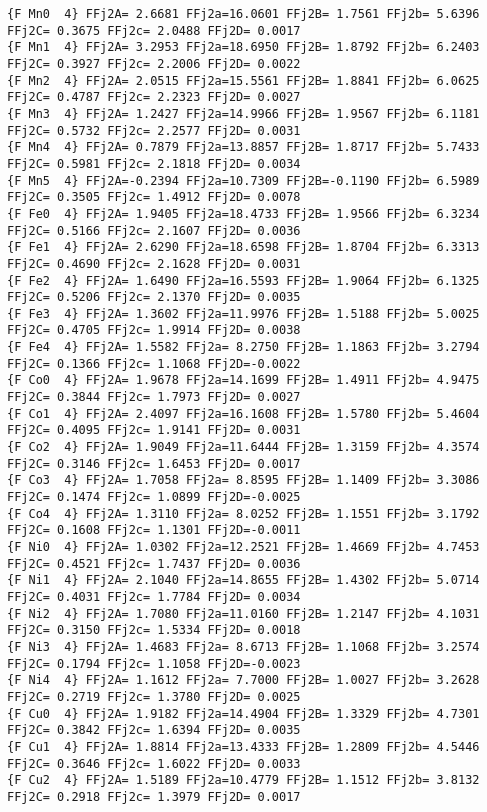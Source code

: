 {\begin{verbatim}
{F Mn0  4} FFj2A= 2.6681 FFj2a=16.0601 FFj2B= 1.7561 FFj2b= 5.6396 FFj2C= 0.3675 FFj2c= 2.0488 FFj2D= 0.0017 
{F Mn1  4} FFj2A= 3.2953 FFj2a=18.6950 FFj2B= 1.8792 FFj2b= 6.2403 FFj2C= 0.3927 FFj2c= 2.2006 FFj2D= 0.0022 
{F Mn2  4} FFj2A= 2.0515 FFj2a=15.5561 FFj2B= 1.8841 FFj2b= 6.0625 FFj2C= 0.4787 FFj2c= 2.2323 FFj2D= 0.0027 
{F Mn3  4} FFj2A= 1.2427 FFj2a=14.9966 FFj2B= 1.9567 FFj2b= 6.1181 FFj2C= 0.5732 FFj2c= 2.2577 FFj2D= 0.0031 
{F Mn4  4} FFj2A= 0.7879 FFj2a=13.8857 FFj2B= 1.8717 FFj2b= 5.7433 FFj2C= 0.5981 FFj2c= 2.1818 FFj2D= 0.0034 
{F Mn5  4} FFj2A=-0.2394 FFj2a=10.7309 FFj2B=-0.1190 FFj2b= 6.5989 FFj2C= 0.3505 FFj2c= 1.4912 FFj2D= 0.0078 
{F Fe0  4} FFj2A= 1.9405 FFj2a=18.4733 FFj2B= 1.9566 FFj2b= 6.3234 FFj2C= 0.5166 FFj2c= 2.1607 FFj2D= 0.0036 
{F Fe1  4} FFj2A= 2.6290 FFj2a=18.6598 FFj2B= 1.8704 FFj2b= 6.3313 FFj2C= 0.4690 FFj2c= 2.1628 FFj2D= 0.0031 
{F Fe2  4} FFj2A= 1.6490 FFj2a=16.5593 FFj2B= 1.9064 FFj2b= 6.1325 FFj2C= 0.5206 FFj2c= 2.1370 FFj2D= 0.0035 
{F Fe3  4} FFj2A= 1.3602 FFj2a=11.9976 FFj2B= 1.5188 FFj2b= 5.0025 FFj2C= 0.4705 FFj2c= 1.9914 FFj2D= 0.0038 
{F Fe4  4} FFj2A= 1.5582 FFj2a= 8.2750 FFj2B= 1.1863 FFj2b= 3.2794 FFj2C= 0.1366 FFj2c= 1.1068 FFj2D=-0.0022 
{F Co0  4} FFj2A= 1.9678 FFj2a=14.1699 FFj2B= 1.4911 FFj2b= 4.9475 FFj2C= 0.3844 FFj2c= 1.7973 FFj2D= 0.0027 
{F Co1  4} FFj2A= 2.4097 FFj2a=16.1608 FFj2B= 1.5780 FFj2b= 5.4604 FFj2C= 0.4095 FFj2c= 1.9141 FFj2D= 0.0031 
{F Co2  4} FFj2A= 1.9049 FFj2a=11.6444 FFj2B= 1.3159 FFj2b= 4.3574 FFj2C= 0.3146 FFj2c= 1.6453 FFj2D= 0.0017 
{F Co3  4} FFj2A= 1.7058 FFj2a= 8.8595 FFj2B= 1.1409 FFj2b= 3.3086 FFj2C= 0.1474 FFj2c= 1.0899 FFj2D=-0.0025 
{F Co4  4} FFj2A= 1.3110 FFj2a= 8.0252 FFj2B= 1.1551 FFj2b= 3.1792 FFj2C= 0.1608 FFj2c= 1.1301 FFj2D=-0.0011 
{F Ni0  4} FFj2A= 1.0302 FFj2a=12.2521 FFj2B= 1.4669 FFj2b= 4.7453 FFj2C= 0.4521 FFj2c= 1.7437 FFj2D= 0.0036 
{F Ni1  4} FFj2A= 2.1040 FFj2a=14.8655 FFj2B= 1.4302 FFj2b= 5.0714 FFj2C= 0.4031 FFj2c= 1.7784 FFj2D= 0.0034 
{F Ni2  4} FFj2A= 1.7080 FFj2a=11.0160 FFj2B= 1.2147 FFj2b= 4.1031 FFj2C= 0.3150 FFj2c= 1.5334 FFj2D= 0.0018 
{F Ni3  4} FFj2A= 1.4683 FFj2a= 8.6713 FFj2B= 1.1068 FFj2b= 3.2574 FFj2C= 0.1794 FFj2c= 1.1058 FFj2D=-0.0023 
{F Ni4  4} FFj2A= 1.1612 FFj2a= 7.7000 FFj2B= 1.0027 FFj2b= 3.2628 FFj2C= 0.2719 FFj2c= 1.3780 FFj2D= 0.0025 
{F Cu0  4} FFj2A= 1.9182 FFj2a=14.4904 FFj2B= 1.3329 FFj2b= 4.7301 FFj2C= 0.3842 FFj2c= 1.6394 FFj2D= 0.0035 
{F Cu1  4} FFj2A= 1.8814 FFj2a=13.4333 FFj2B= 1.2809 FFj2b= 4.5446 FFj2C= 0.3646 FFj2c= 1.6022 FFj2D= 0.0033 
{F Cu2  4} FFj2A= 1.5189 FFj2a=10.4779 FFj2B= 1.1512 FFj2b= 3.8132 FFj2C= 0.2918 FFj2c= 1.3979 FFj2D= 0.0017 

\end{verbatim}}

